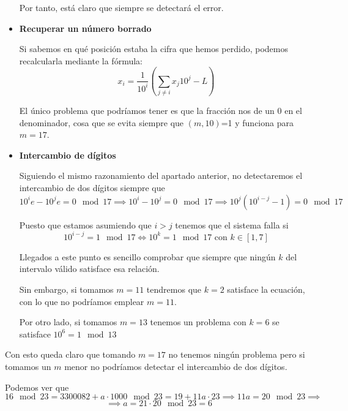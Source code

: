 \begin{problem}[3]
\begin{itemize}
Por tanto, está claro que siempre se detectará el error.

\item \textbf{Recuperar un número borrado}

Si sabemos en qué posición estaba la cifra que hemos perdido, podemos recalcularla mediante la fórmula:
\[x_i=\frac{1}{10^i}\left(\sum_{j\neq i}x_j10^j-L \right)\]

El único problema que podríamos tener es que la fracción nos de un 0 en el denominador, cosa que se evita siempre que $(m,10)$=1 y funciona para $m=17$.

\item \textbf{Intercambio de dígitos}

Siguiendo el mismo razonamiento del apartado anterior, no detectaremos el intercambio de dos dígitos siempre que
\[10^ie-10^je=0 \mod 17 \implies 10^i-10^j=0\mod 17 \implies 10^j(10^{i-j}-1)=0 \mod 17\]

Puesto que estamos asumiendo que $i>j$ tenemos que el sistema falla si
\[10^{i-j}=1 \mod 17 \iff 10^k = 1 \mod 17 \text{ con }k\in[1,7]\]

Llegados a este punto es sencillo comprobar que siempre que ningún $k$ del intervalo válido satisface esa relación.

Sin embargo, si tomamos $m=11$ tendremos que $k=2$ satisface la ecuación, con lo que no podríamos emplear $m=11$.

Por otro lado, si tomamos $m=13$ tenemos un problema con $k=6$ se satisface $10^6=1\mod 13$
\end{itemize}

Con esto queda claro que tomando $m=17$ no tenemos ningún problema pero si tomamos un $m$ menor no podríamos detectar el intercambio de dos dígitos.



\spart

Podemos ver que
\[16 \mod 23 = 3300082+a\cdot 1000 \mod 23 = 19+11a\cdot 23 \implies 11a=20 \mod 23 \implies\]
\[\implies a = 21 \cdot 20 \mod 23 = 6\]
\end{problem}

